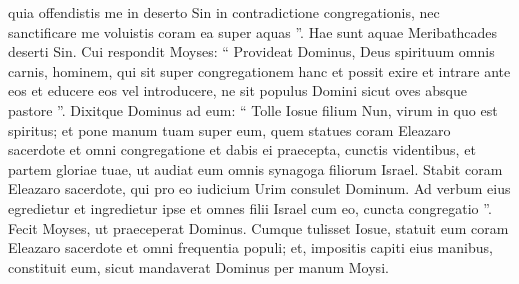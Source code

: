 \begin{biblechapter}
\begin{biblechapter}
\begin{biblechapter}
\begin{biblechapter}
\begin{biblechapter}
\begin{biblechapter}
\begin{biblechapter}
\begin{biblechapter}
\begin{biblechapter}
\begin{biblechapter}
\begin{biblechapter}
\begin{biblechapter}
\begin{biblechapter}
\begin{biblechapter}
\begin{biblechapter}
\begin{biblechapter}
\begin{biblechapter}
\begin{biblechapter}
\begin{biblechapter}
\begin{biblechapter}
\begin{biblechapter}
\begin{biblechapter}
\begin{biblechapter}
\begin{biblechapter}
\begin{biblechapter}
\begin{biblechapter}
\begin{biblechapter}
\verse quia offendistis me in deserto Sin in contradictione congregationis, nec sanctificare me voluistis coram ea super aquas ”. Hae sunt aquae Meribathcades deserti Sin.
 \verse Cui respondit Moyses: 
\verse “ Provideat Dominus, Deus spirituum omnis carnis, hominem, qui sit super congregationem hanc 
\verse et possit exire et intrare ante eos et educere eos vel introducere, ne sit populus Domini sicut oves absque pastore ”. 
\verse Dixitque Dominus ad eum: “ Tolle Iosue filium Nun, virum in quo est spiritus; et pone manum tuam super eum, 
\verse quem statues coram Eleazaro sacerdote et omni congregatione et dabis ei praecepta, cunctis videntibus, 
\verse et partem gloriae tuae, ut audiat eum omnis synagoga filiorum Israel. 
\verse Stabit coram Eleazaro sacerdote, qui pro eo iudicium Urim consulet Dominum. Ad verbum eius egredietur et ingredietur ipse et omnes filii Israel cum eo, cuncta congregatio ”.
 \verse Fecit Moyses, ut praeceperat Dominus. Cumque tulisset Iosue, statuit eum coram Eleazaro sacerdote et omni frequentia populi; 
\verse et, impositis capiti eius manibus, constituit eum, sicut mandaverat Dominus per manum Moysi.
 

\end{biblechapter}
\end{biblechapter}
\end{biblechapter}
\end{biblechapter}
\end{biblechapter}
\end{biblechapter}
\end{biblechapter}
\end{biblechapter}
\end{biblechapter}
\end{biblechapter}
\end{biblechapter}
\end{biblechapter}
\end{biblechapter}
\end{biblechapter}
\end{biblechapter}
\end{biblechapter}
\end{biblechapter}
\end{biblechapter}
\end{biblechapter}
\end{biblechapter}
\end{biblechapter}
\end{biblechapter}
\end{biblechapter}
\end{biblechapter}
\end{biblechapter}
\end{biblechapter}
\end{biblechapter}
